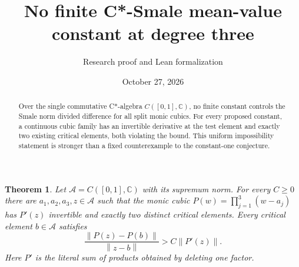 \documentclass[11pt]{article}
\title{No finite C*-Smale mean-value constant at degree three}
\author{Research proof and Lean formalization}
\date{October 27, 2026}
\newtheorem{theorem}{Theorem}
\newcommand{\C}{\mathbb C}
\newcommand{\A}{\mathcal A}
\newcommand{\norm}[1]{\left\lVert#1\right\rVert}
\begin{document}
\maketitle
\begin{abstract}
Over the single commutative C*-algebra $C([0,1],\C)$, no finite constant
controls the Smale norm divided difference for all split monic cubics.
For every proposed constant, a continuous cubic family has an invertible
derivative at the test element and exactly two existing critical elements,
both violating the bound. This uniform impossibility statement is stronger
than a fixed counterexample to the constant-one conjecture.
\end{abstract}

\begin{theorem}\label{main}
Let $\A=C([0,1],\C)$ with its supremum norm. For every $C\geq0$ there are
$a_1,a_2,a_3,z\in\A$ such that the monic cubic
$P(w)=\prod_{j=1}^3(w-a_j)$ has $P'(z)$ invertible and exactly two distinct
critical elements. Every critical element $b\in\A$ satisfies
\begin{equation}\label{violation}
 \frac{\norm{P(z)-P(b)}}{\norm{z-b}}>C\norm{P'(z)}.
\end{equation}
Here $P'$ is the literal sum of products obtained by deleting one factor.
\end{theorem}
\end{document}

